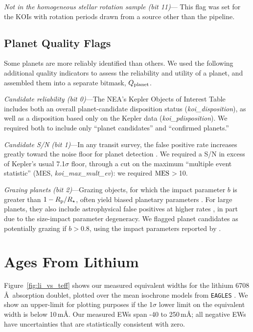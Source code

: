 \documentclass[11pt,twocolumn,tighten,linenumbers]{aastex63}
\begin{document}
{\it Not in the homogeneous stellar rotation sample (bit 11)}--- This
flag was set for the KOIs with rotation periods drawn from a source
other than the \citeauthor{Santos_2019} pipeline.




\subsection{Planet Quality Flags} \label{subsec:plflags} Some planets
are more reliably identified than others.  We used the following
additional quality indicators to assess the reliability and utility of
a planet, and assembled them into a separate bitmask, $Q_{\rm
planet}$.

{\it Candidate reliability (bit 0)}---The NEA's Kepler Objects of
Interest Table includes both an overall planet-candidate disposition
status ({\it koi\_disposition}), as well as a disposition based only
on the Kepler data ({\it koi\_pdisposition}).  We required both to
include only ``planet candidates'' and ``confirmed planets.'' 

{\it Candidate S/N (bit 1)}---In any transit survey, the false
positive rate increases greatly toward the noise floor for planet
detection \citep[e.g.][]{2002ApJ...564..495J}.  We required a S/N in
excess of Kepler's usual 7.1$\sigma$ floor, through a cut on the
maximum ``multiple event statistic'' (MES, {\it koi\_max\_mult\_ev}):
we required ${\rm MES}$$>$10.

{\it Grazing planets (bit 2)}---Grazing objects, for which the impact
parameter $b$ is greater than $1-R_{\rm p}/R_\star$, often yield
biased planetary parameters \citep[e.g.][]{2022AJ....163..111G}.  For
large planets, they also include astrophysical false positives at
higher rates \citep{2016ApJ...822...86M}, in part due to the
size-impact parameter degeneracy.  We flagged planet candidates as
potentially grazing if $b$$>$0.8, using the impact parameters reported
by \citet{Thompson_2018}.




\section{Ages From Lithium}
\label{sec:liage} 

Figure~\ref{fig:li_vs_teff} shows our measured equivalent widths for
the lithium 6708\,\AA\ absorption doublet, plotted over the mean
isochrone models from \texttt{EAGLES} \citep{Jeffries_2023}.  We
show an upper-limit for plotting purposes if the 1$\sigma$ lower
limit on the equivalent width is below 10\,m\AA.  Our measured EWs
span -40 to 250\,m\AA; all negative EWs have uncertainties that are
statistically consistent with zero.
\end{document}
